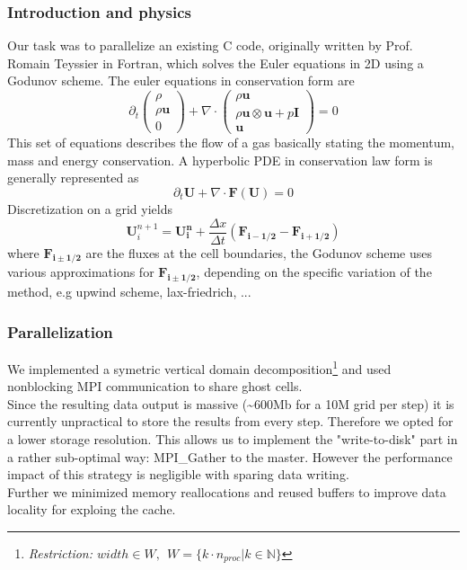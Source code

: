 \documentclass{beamer}
\begin{document}
\begin{frame}
\frametitle{Introduction and physics}
\justify
\small{
Our task was to parallelize an existing C code, originally written by Prof. Romain Teyssier in Fortran, which solves the Euler equations in 2D using a Godunov scheme. The euler equations in conservation form are 
\begin{equation}
\partial_t
\begin{pmatrix} \rho    \\ \rho \mathbf{u}\\0\end{pmatrix}+\nabla\cdot\begin{pmatrix} \rho\mathbf{u}    \\ \rho\mathbf{u}\otimes\mathbf{u}+p\mathbf{I}\\ \mathbf{u}\end{pmatrix} = 0
\end{equation}
This set of equations describes the flow of a gas basically stating the momentum, mass and energy conservation. A hyperbolic PDE in conservation law form is generally represented as
\begin{equation}
\partial_t\mathbf{U} + \nabla\cdot\mathbf{F(U)} = 0
\label{eq:bb}
\end{equation}
Discretization on a grid yields
\begin{equation}
\mathbf{U}^{n+1}_i=\mathbf{U^n_i}+\frac{\Delta x}{\Delta t}(\mathbf{F_{i-1/2}}-\mathbf{F_{i+1/2}})
\label{eq:bc}
\end{equation}
where $\mathbf{F_{i\pm1/2}}$ are the fluxes at the cell boundaries, the Godunov scheme uses various approximations for $\mathbf{F_{i\pm1/2}}$, depending on the specific variation of the method, e.g upwind scheme, lax-friedrich, ... \\
}

\vspace{1mm}

\end{frame}
%
%
%
\begin{frame}
\frametitle{Parallelization}

We implemented a symetric vertical domain decomposition\footnote{ 
\emph{Restriction: $width\in W,~~W=\{k\cdot n_{proc}|k\in\mathbb{N}\}$ } } and used nonblocking MPI communication to share ghost cells.\\
\vspace{2mm}
Since the resulting data output is massive (\textasciitilde{}600Mb for a 10M grid per step) it is currently unpractical to store the results from every step. Therefore we opted for a lower storage resolution. This allows us to implement the "write-to-disk" part in a rather sub-optimal way: MPI\_Gather to the master. However the performance impact of this strategy is negligible with sparing data writing.\\
\vspace{2mm}
Further we minimized memory reallocations and reused buffers to improve data locality for exploing the cache. \\

\end{frame}
\end{document}
